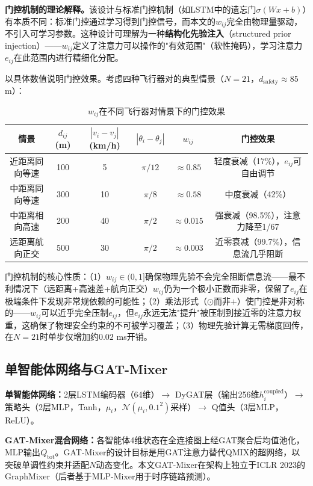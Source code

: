 \documentclass[12pt,a4paper,UTF8]{ctexart}
\begin{document}
\textbf{门控机制的理论解释。}该设计与标准门控机制（如LSTM中的遗忘门$\sigma(Wx+b)$）有本质不同：标准门控通过学习得到门控信号，而本文的$w_{ij}$完全由物理量驱动，不引入可学习参数。这种设计可理解为一种\textbf{结构化先验注入}（structured prior injection）——$w_{ij}$定义了注意力可以操作的"有效范围"（软性掩码），学习注意力$e_{ij}$在此范围内进行精细化分配。

以具体数值说明门控效果。考虑四种飞行器对的典型情景（$N=21$，$d_{\text{safety}}\approx85$ m）：

\begin{table}[H]
    \centering\small
    \caption{$w_{ij}$在不同飞行器对情景下的门控效果}
    \label{tab:gating}
    \begin{tabular}{|c|c|c|c|c|c|}
        \hline
        \textbf{情景} & $d_{ij}$(m) & $|v_i-v_j|$(km/h) & $|\theta_i-\theta_j|$ & $w_{ij}$ & \textbf{门控效果} \\
        \hline
        近距离同向等速 & 100 & 5 & $\pi/12$ & $\approx0.85$ & 轻度衰减（17\%），$e_{ij}$可自由调节 \\
        中距离同向等速 & 300 & 10 & $\pi/8$ & $\approx0.58$ & 中度衰减（42\%） \\
        中距离相向高速 & 200 & 40 & $\pi/2$ & $\approx0.015$ & 强衰减（98.5\%），注意力降至1/67 \\
        远距离航向正交 & 500 & 30 & $\pi/2$ & $\approx0.003$ & 近零衰减（99.7\%），信息流几乎阻断 \\
        \hline
    \end{tabular}
\end{table}

门控机制的核心性质：（1）$w_{ij}\in(0,1]$确保物理先验不会完全阻断信息流——最不利情况下（远距离+高速差+航向正交）$w_{ij}$仍为一个极小正数而非零，保留了$e_{ij}$在极端条件下发现非常规依赖的可能性；（2）乘法形式（$\odot$而非$+$）使门控是非对称的——$w_{ij}$可以近乎完全压制$e_{ij}$，但$e_{ij}$永远无法"提升"被压制到接近零的注意力权重，这确保了物理安全约束的不可被学习覆盖；（3）物理先验计算无需梯度回传，在$N=21$时单步仅增加约$0.02$ ms开销。

\subsection{单智能体网络与GAT-Mixer}

\textbf{单智能体网络：}2层LSTM编码器（64维）$\to$ DyGAT层（输出256维$h_i^{\text{coupled}}$）$\to$ 策略头（2层MLP，Tanh，$\mu_i$，$\mathcal{N}(\mu_i,0.1^2)$采样）$\to$ Q值头（3层MLP，ReLU）。

\textbf{GAT-Mixer混合网络：}各智能体4维状态在全连接图上经GAT聚合后均值池化，MLP输出$Q_{\text{tot}}$。GAT-Mixer的设计目标是用GAT注意力替代QMIX的超网络，以突破单调性约束并适配$N$动态变化。本文GAT-Mixer在架构上独立于ICLR 2023的GraphMixer\cite{ref28}（后者基于MLP-Mixer用于时序链路预测）。
\end{document}
